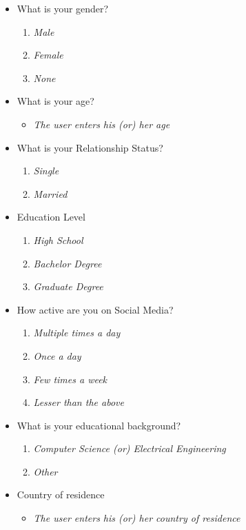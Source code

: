 \begin{itemize}
\item What is your gender?
\begin{enumerate}
\item {\it Male}
\item {\it Female}
\item {\it None}
\end{enumerate}
\item What is your age?
\begin{itemize}
\item {\it The user enters his (or) her age}
\end{itemize}

\item What is your Relationship Status?
\begin{enumerate}
\item {\it Single}
\item {\it Married}
\end{enumerate}
\item Education Level
\begin{enumerate}
\item {\it High School}
\item {\it Bachelor Degree}
\item {\it Graduate Degree}
\end{enumerate}
\item How active are you on Social Media?
\begin{enumerate}
\item {\it Multiple times a day}
\item {\it Once a day}
\item {\it Few times a week}
\item {\it Lesser than the above}
\end{enumerate}
\item What is your educational background?
\begin{enumerate}
\item {\it Computer Science (or) Electrical Engineering}
\item {\it Other}
\end{enumerate}
\item Country of residence
\begin{itemize}
\item {\it The user enters his (or) her country of residence}
\end{itemize}
\end{itemize}



